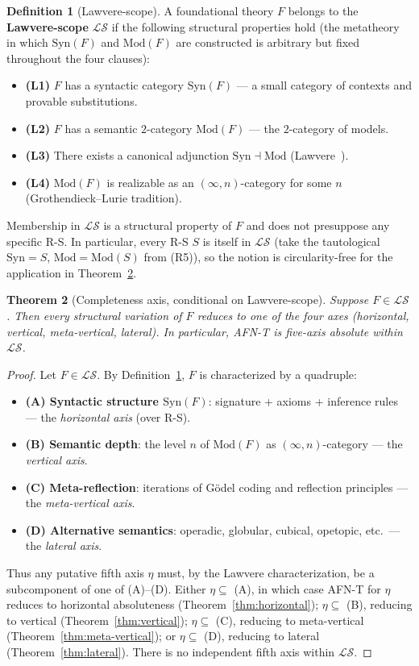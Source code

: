 \documentclass[11pt]{article}
\theoremstyle{plain}
\newtheorem{theorem}{Theorem}[section]
\theoremstyle{definition}
\newtheorem{definition}[theorem]{Definition}
\newcommand{\cS}{\mathcal{S}}
\newcommand{\cL}{\mathcal{L}}
\newcommand{\Syn}{\mathrm{Syn}}
\newcommand{\Mod}{\mathrm{Mod}}
\begin{document}
\begin{definition}[Lawvere-scope]\label{def:law-scope}
A foundational theory $F$ belongs to the \textbf{Lawvere-scope} $\cL\cS$ if the following structural properties hold (the metatheory in which $\Syn(F)$ and $\Mod(F)$ are constructed is arbitrary but fixed throughout the four clauses):
\begin{itemize}
\item \textbf{(L1)} $F$ has a syntactic category $\Syn(F)$ --- a small category of contexts and provable substitutions.
\item \textbf{(L2)} $F$ has a semantic $2$-category $\Mod(F)$ --- the $2$-category of models.
\item \textbf{(L3)} There exists a canonical adjunction $\Syn \dashv \Mod$ (Lawvere~\cite{Lawvere1969}).
\item \textbf{(L4)} $\Mod(F)$ is realizable as an $(\infty, n)$-category for some $n$ (Grothendieck--Lurie tradition).
\end{itemize}
Membership in $\cL\cS$ is a structural property of $F$ and does not presuppose any specific R-S. In particular, every R-S $S$ is itself in $\cL\cS$ (take the tautological $\Syn = S$, $\Mod = \Mod(S)$ from (R5)), so the notion is circularity-free for the application in Theorem~\ref{thm:completeness}.
\end{definition}

\begin{theorem}[Completeness axis, conditional on Lawvere-scope]\label{thm:completeness}
Suppose $F \in \cL\cS$. Then every structural variation of $F$ reduces to one of the four axes (horizontal, vertical, meta-vertical, lateral). In particular, AFN-T is five-axis absolute within $\cL\cS$.
\end{theorem}

\begin{proof}
Let $F \in \cL\cS$. By Definition~\ref{def:law-scope}, $F$ is characterized by a quadruple:
\begin{itemize}
\item \textbf{(A) Syntactic structure $\Syn(F)$}: signature + axioms + inference rules --- the \emph{horizontal axis} (over R-S).
\item \textbf{(B) Semantic depth}: the level $n$ of $\Mod(F)$ as $(\infty, n)$-category --- the \emph{vertical axis}.
\item \textbf{(C) Meta-reflection}: iterations of G\"odel coding and reflection principles --- the \emph{meta-vertical axis}.
\item \textbf{(D) Alternative semantics}: operadic, globular, cubical, opetopic, etc.\ --- the \emph{lateral axis}.
\end{itemize}
Thus any putative fifth axis $\eta$ must, by the Lawvere characterization, be a subcomponent of one of (A)--(D). Either $\eta \subseteq$ (A), in which case AFN-T for $\eta$ reduces to horizontal absoluteness (Theorem~\ref{thm:horizontal}); $\eta \subseteq$ (B), reducing to vertical (Theorem~\ref{thm:vertical}); $\eta \subseteq$ (C), reducing to meta-vertical (Theorem~\ref{thm:meta-vertical}); or $\eta \subseteq$ (D), reducing to lateral (Theorem~\ref{thm:lateral}). There is no independent fifth axis within $\cL\cS$.
\end{proof}
\end{document}
